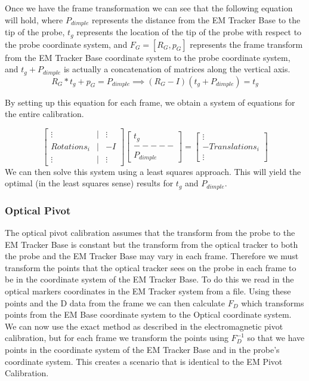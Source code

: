 \documentclass[a4paper]{article}
\begin{document}
Once we have the frame transformation we can see that the following equation will hold, where $P_{dimple}$ represents the distance from the EM Tracker Base to the tip of the probe, $t_g$ represents the location of the tip of the probe with respect to the probe coordinate system, and $F_G = [R_G, p_G]$ represents the frame transform from the EM Tracker Base coordinate system to the probe coordinate system, and $t_g + P_{dimple}$ is actually a concatenation of matrices along the vertical axis.
\[ R_G * t_g + p_G = P_{dimple} \implies (R_G - I)(t_g + P_{dimple}) = t_g\]

By setting up this equation for each frame, we obtain a system of equations for the entire calibration. 

\[
\begin{bmatrix}
    \vdots & | & \vdots \\
    Rotations_i & | & -I \\
    \vdots & | & \vdots
\end{bmatrix}
\begin{bmatrix}
    t_g \\
    ----- \\
    P_{dimple}
\end{bmatrix}
 = 
\begin{bmatrix}
    \vdots \\
    -Translations_i \\
    \vdots
\end{bmatrix}
\]
We can then solve this system using a least squares approach. This will yield the optimal (in the least squares sense) results for $t_g$ and $P_{dimple}$. 
\subsubsection{Optical Pivot}
The optical pivot calibration assumes that the transform from the probe to the EM Tracker Base is constant but the transform from the optical tracker to both the probe and the EM Tracker Base may vary in each frame. Therefore we must transform the points that the optical tracker sees on the probe in each frame to be in the coordinate system of the EM Tracker Base. To do this we read in the optical markers coordinates in the EM Tracker system from a file. Using these points and the D data from the frame we can then calculate $F_D$ which transforms points from the EM Base coordinate system to the Optical coordinate system. We can now use the exact method as described in the electromagnetic pivot calibration, but for each frame we transform the points using $F_D^{-1}$ so that we have points in the coordinate system of the EM Tracker Base and in the probe's coordinate system. This creates a scenario that is identical to the EM Pivot Calibration. 
\end{document}

